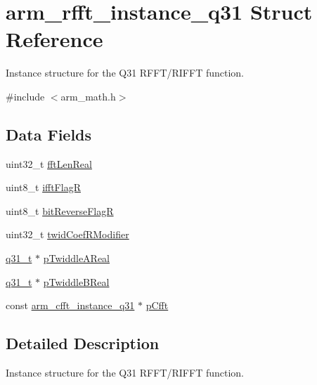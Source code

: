 \hypertarget{structarm__rfft__instance__q31}{}\section{arm\+\_\+rfft\+\_\+instance\+\_\+q31 Struct Reference}
\label{structarm__rfft__instance__q31}


Instance structure for the Q31 R\+F\+F\+T/\+R\+I\+F\+FT function.  




{\ttfamily \#include $<$arm\+\_\+math.\+h$>$}

\subsection*{Data Fields}
\begin{DoxyCompactItemize}
\item 
uint32\+\_\+t \mbox{\hyperlink{structarm__rfft__instance__q31_adf0d4604cf5546075d9d4cf122d6c986}{fft\+Len\+Real}}
\item 
uint8\+\_\+t \mbox{\hyperlink{structarm__rfft__instance__q31_a787d72055c89e4d62b188d6bd646341c}{ifft\+FlagR}}
\item 
uint8\+\_\+t \mbox{\hyperlink{structarm__rfft__instance__q31_ad56ec2425e2422108b8767b43d944591}{bit\+Reverse\+FlagR}}
\item 
uint32\+\_\+t \mbox{\hyperlink{structarm__rfft__instance__q31_a5b06f7f76c018db993fe6acc5708c589}{twid\+Coef\+R\+Modifier}}
\item 
\mbox{\hyperlink{arm__math_8h_adc89a3547f5324b7b3b95adec3806bc0}{q31\+\_\+t}} $\ast$ \mbox{\hyperlink{structarm__rfft__instance__q31_a059faa282f9186687d843ead4a7a0d7e}{p\+Twiddle\+A\+Real}}
\item 
\mbox{\hyperlink{arm__math_8h_adc89a3547f5324b7b3b95adec3806bc0}{q31\+\_\+t}} $\ast$ \mbox{\hyperlink{structarm__rfft__instance__q31_a611c385424ce77519f599980f96d5846}{p\+Twiddle\+B\+Real}}
\item 
const \mbox{\hyperlink{structarm__cfft__instance__q31}{arm\+\_\+cfft\+\_\+instance\+\_\+q31}} $\ast$ \mbox{\hyperlink{structarm__rfft__instance__q31_aa583d759b8b176ad1696b27eb5821daf}{p\+Cfft}}
\end{DoxyCompactItemize}


\subsection{Detailed Description}
Instance structure for the Q31 R\+F\+F\+T/\+R\+I\+F\+FT function. 

